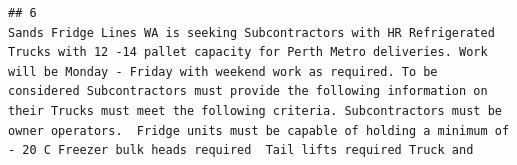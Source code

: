 \documentclass[11pt,a4paper,]{article}
\begin{document}
\begin{verbatim}
## 6                                                                                                                                                                                                                                                                                                                                                                                                                                                                                                                                                                                                                                                                                                                                                                                                                                                                                                                                                                                                                                                                                                                                                                                                                                                                                                                                                                                                                                                                                                                                                                                                                                                                                                                                                                                                                                                                                                                                                                                                                                                                                                                                                                                                                                                                                                                                                                                                                                                                                                                                                                                                                                                                                                                                                                                                                                                                                                                                                     Sands Fridge Lines WA is seeking Subcontractors with HR Refrigerated Trucks with 12 -14 pallet capacity for Perth Metro deliveries. Work will be Monday - Friday with weekend work as required. To be considered Subcontractors must provide the following information on their Trucks must meet the following criteria. Subcontractors must be owner operators.  Fridge units must be capable of holding a minimum of - 20 C Freezer bulk heads required  Tail lifts required Truck and 
\end{verbatim}
\end{document}
